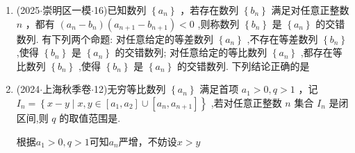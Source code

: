 \begin{enumerate}
      任意等比数列 $\left\{  {a}_{n}\right\}$ ，若首项 ${a}_{1} > 0$ ，则 $\left\{  {a}_{n}\right\}$ 满足“性质 $\Omega$ ”.

    下列判断正确的是 

    \begin{jieda}
        设等差数列 $\left\{  {a}_{n}\right\}$通项公式为$a_n = an+b, a > 0$，则满足“性质 $\Omega$ ”即$\dfrac{a(n+1)+b}{n+1} \geq \dfrac{an+b}{n}$，当$b = 0$时即可.

        设等比数列 $\left\{  {a}_{n}\right\}$通项公式为$a_n = a_1q^{n-1}, a_1 > 0, q > 1$，则满足“性质 $\Omega$ ”即$\dfrac{a_1q^n}{n+1} \geq \dfrac{a_1q^{n-1}}{n}$，即$q \geq \dfrac{n+1}{n}$，故$q \geq 2$.

        \ps 举反例$q = 1$也可.
    \end{jieda}

    \item (2025$\cdot$崇明区一模$\cdot$16)已知数列 $\left\{  {a}_{n}\right\}$ ，若存在数列 $\left\{  {b}_{n}\right\}$ 满足对任意正整数 $n$ ，都有 $\left( {{a}_{n} - {b}_{n}}\right) \left( {{a}_{n + 1} - }\right.  \left. {b}_{n + 1}\right)  < 0$ ,则称数列 $\left\{  {b}_{n}\right\}$ 是 $\left\{  {a}_{n}\right\}$ 的交错数列. 有下列两个命题:    对任意给定的等差数列 $\left\{  {a}_{n}\right\}$ ,不存在等差数列 $\left\{  {b}_{n}\right\}$ ,使得 $\left\{  {b}_{n}\right\}$ 是 $\left\{  {a}_{n}\right\}$ 的交错数列;    对任意给定的等比数列 $\left\{  {a}_{n}\right\}$ ,都存在等比数列 $\left\{  {b}_{n}\right\}$ ,使得 $\left\{  {b}_{n}\right\}$ 是 $\left\{  {a}_{n}\right\}$ 的交错数列. 下列结论正确的是 
    \begin{jieda}
    \end{jieda}

    \item (2024$\cdot$上海秋季卷$\cdot$12)无穷等比数列 $\left\{  {a}_{n}\right\}$ 满足首项 ${a}_{1} > 0,q > 1$ ，记 ${I}_{n} = \left\{  {x - y \mid  x,y \in  \left\lbrack  {{a}_{1},{a}_{2}}\right\rbrack   \cup  }\right.  \left. \left\lbrack  {{a}_{n},{a}_{n + 1}}\right\rbrack  \right\}$ ,若对任意正整数 $n$ 集合 ${I}_{n}$ 是闭区间,则 $q$ 的取值范围是.
    \begin{jieda}
        根据${a}_{1} > 0,q > 1$可知$a_n$严增，不妨设$x > y$


\end{jieda}
\end{enumerate}
